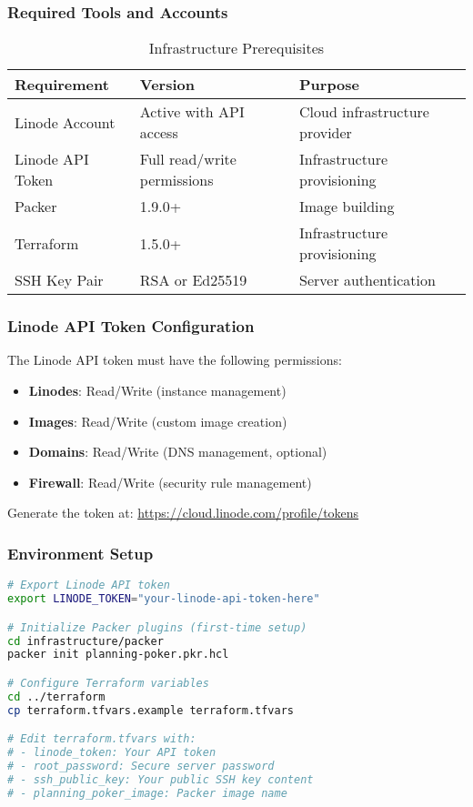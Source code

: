 \documentclass[11pt,a4paper]{article}
\begin{document}
\subsubsection{Required Tools and Accounts}

\begin{table}[H]
\centering
\begin{tabular}{@{}lll@{}}
\toprule
\textbf{Requirement} & \textbf{Version} & \textbf{Purpose} \\
\midrule
Linode Account & Active with API access & Cloud infrastructure provider \\
Linode API Token & Full read/write permissions & Infrastructure provisioning \\
Packer & 1.9.0+ & Image building \\
Terraform & 1.5.0+ & Infrastructure provisioning \\
SSH Key Pair & RSA or Ed25519 & Server authentication \\
\bottomrule
\end{tabular}
\caption{Infrastructure Prerequisites}
\label{tab:infra-prerequisites}
\end{table}

\subsubsection{Linode API Token Configuration}

The Linode API token must have the following permissions:

\begin{itemize}
    \item \textbf{Linodes}: Read/Write (instance management)
    \item \textbf{Images}: Read/Write (custom image creation)
    \item \textbf{Domains}: Read/Write (DNS management, optional)
    \item \textbf{Firewall}: Read/Write (security rule management)
\end{itemize}

Generate the token at: \url{https://cloud.linode.com/profile/tokens}

\subsubsection{Environment Setup}

\begin{lstlisting}[language=bash, caption=Environment Configuration]
# Export Linode API token
export LINODE_TOKEN="your-linode-api-token-here"

# Initialize Packer plugins (first-time setup)
cd infrastructure/packer
packer init planning-poker.pkr.hcl

# Configure Terraform variables
cd ../terraform
cp terraform.tfvars.example terraform.tfvars

# Edit terraform.tfvars with:
# - linode_token: Your API token
# - root_password: Secure server password
# - ssh_public_key: Your public SSH key content
# - planning_poker_image: Packer image name
\end{lstlisting}
\end{document}
